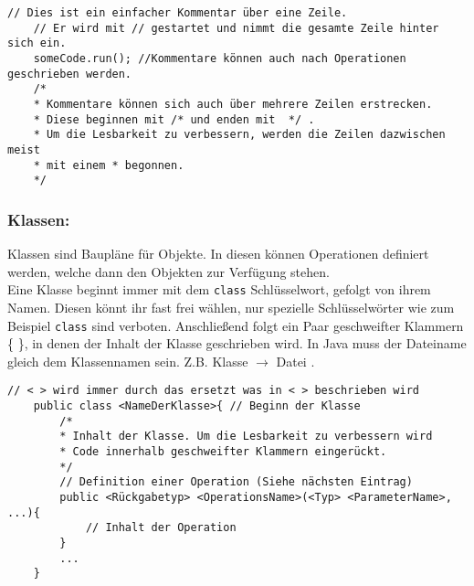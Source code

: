 \begin{lstlisting}[title=\textbf{Kommentar Beispiel}]
	// Dies ist ein einfacher Kommentar über eine Zeile.
	// Er wird mit // gestartet und nimmt die gesamte Zeile hinter sich ein.
	someCode.run(); //Kommentare können auch nach Operationen geschrieben werden.
	/*
	* Kommentare können sich auch über mehrere Zeilen erstrecken.
	* Diese beginnen mit /* und enden mit  */ . 
	* Um die Lesbarkeit zu verbessern, werden die Zeilen dazwischen meist 
	* mit einem * begonnen.
	*/
\end{lstlisting}
\lstset{
	basicstyle=\small
}
\begin{Infobox}
	
	\subsubsection*{Klassen:}
	Klassen sind Baupläne für Objekte.
	In diesen können Operationen definiert werden, welche dann den Objekten zur Verfügung stehen.\\
	Eine Klasse beginnt immer mit dem \lstinline{class} Schlüsselwort, gefolgt von ihrem Namen.
	Diesen könnt ihr fast frei wählen, nur spezielle Schlüsselwörter wie zum Beispiel \lstinline{class} sind verboten.
	Anschließend folgt ein Paar geschweifter Klammern \{ \}, in denen der Inhalt der Klasse geschrieben wird.
	In Java muss der Dateiname gleich dem Klassennamen sein. Z.B. Klasse  $\rightarrow$ Datei .
\end{Infobox}
\begin{lstlisting}[title=\textbf{Klassen Syntax}]
	// < > wird immer durch das ersetzt was in < > beschrieben wird
	public class <NameDerKlasse>{ // Beginn der Klasse
		/*  
		* Inhalt der Klasse. Um die Lesbarkeit zu verbessern wird
		* Code innerhalb geschweifter Klammern eingerückt.
		*/
		// Definition einer Operation (Siehe nächsten Eintrag)
		public <Rückgabetyp> <OperationsName>(<Typ> <ParameterName>, ...){
			// Inhalt der Operation
		}
		...
	}
\end{lstlisting}

\newpage

